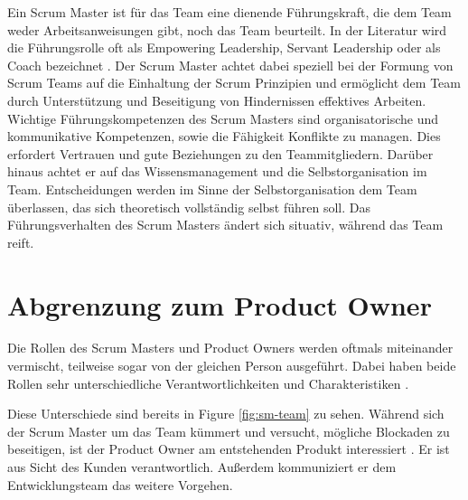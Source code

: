 \documentclass[5pt, final]{beamer}
\begin{document}
\begin{frame}[t]
\begin{multicols}{3}
            Ein Scrum Master ist für das Team eine dienende Führungskraft, die dem Team weder Arbeitsanweisungen gibt, noch das Team beurteilt. In der Literatur wird die Führungsrolle oft als Empowering Leadership, Servant Leadership oder als Coach bezeichnet \cite{Spiegler21}\cite{Frye24}. Der Scrum Master achtet dabei speziell bei der Formung von Scrum Teams auf die Einhaltung der Scrum Prinzipien und ermöglicht dem Team durch Unterstützung und Beseitigung von Hindernissen effektives Arbeiten. 
            Wichtige Führungskompetenzen des Scrum Masters sind organisatorische und kommunikative Kompetenzen, sowie die Fähigkeit Konflikte zu managen. Dies erfordert Vertrauen und gute Beziehungen zu den Teammitgliedern. Darüber hinaus achtet er auf das Wissensmanagement und die Selbstorganisation im Team.\cite{Frye24} 
            Entscheidungen werden im Sinne der Selbstorganisation dem Team überlassen, das sich theoretisch vollständig selbst führen soll. Das Führungsverhalten des Scrum Masters ändert sich situativ, während das Team reift. \cite{Spiegler21}
			
			\section{Abgrenzung zum Product Owner}
			
            Die Rollen des Scrum Masters und Product Owners werden oftmals miteinander vermischt, teilweise sogar von der gleichen Person ausgeführt.
            Dabei haben beide Rollen sehr unterschiedliche Verantwortlichkeiten und Charakteristiken \cite{sutherland14}.
            
            Diese Unterschiede sind bereits in Figure \ref{fig:sm-team} zu sehen.
            Während sich der Scrum Master um das Team kümmert und versucht, mögliche Blockaden zu beseitigen, ist der Product Owner am entstehenden Produkt interessiert \cite{Spiegler21}.
            Er ist aus Sicht des Kunden verantwortlich.
            Außerdem kommuniziert er dem Entwicklungsteam das weitere Vorgehen.
            

\end{multicols}
\end{frame}
\end{document}
